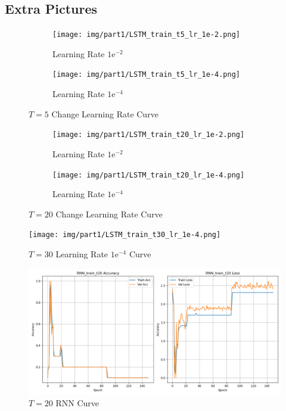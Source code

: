
\begin{appendix}

  \section{Extra Pictures}

  \begin{figure}[!htbp]
    \centering
    \begin{subfigure}[b]{1\textwidth}
      \texttt{[image: img/part1/LSTM\_train\_t5\_lr\_1e-2.png]}
      \caption{Learning Rate $1\mathrm{e}^{-2}$}
    \end{subfigure}
    \begin{subfigure}[b]{1\textwidth}
      \texttt{[image: img/part1/LSTM\_train\_t5\_lr\_1e-4.png]}
      \caption{Learning Rate $1\mathrm{e}^{-4}$}
    \end{subfigure}
    \caption{$T = 5$ Change Learning Rate Curve}
    \label{fig:p1_t5_lr_change}
  \end{figure}

  \begin{figure}[!htbp]
    \centering
    \begin{subfigure}[b]{1\textwidth}
      \texttt{[image: img/part1/LSTM\_train\_t20\_lr\_1e-2.png]}
      \caption{Learning Rate $1\mathrm{e}^{-2}$}
    \end{subfigure}
    \begin{subfigure}[b]{1\textwidth}
      \texttt{[image: img/part1/LSTM\_train\_t20\_lr\_1e-4.png]}
      \caption{Learning Rate $1\mathrm{e}^{-4}$}
    \end{subfigure}
    \caption{$T = 20$ Change Learning Rate Curve}
    \label{fig:p1_t20_lr_change}
  \end{figure}

  \begin{figure}[!htbp]
    \centering
    \texttt{[image: img/part1/LSTM\_train\_t30\_lr\_1e-4.png]}
    \caption{$T = 30$ Learning Rate $1\mathrm{e}^{-4}$ Curve}
    \label{fig:p1_t30}
  \end{figure}

  \begin{figure}[!htbp]
    \centering
    \includegraphics[width=1\textwidth]{img/part1/RNN_train_t20_default.png}
    \caption{$T = 20$ RNN Curve}
    \label{fig:p1_t20_rnn}
  \end{figure}

\end{appendix}
